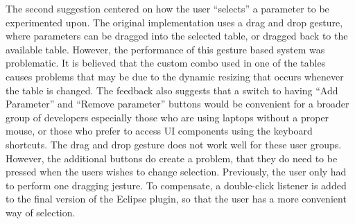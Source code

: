 The second suggestion centered on how the user ``selects'' a parameter to be experimented upon. The original implementation uses a drag and drop gesture, where parameters can be dragged into the selected table, or dragged back to the available table. However, the performance of this gesture based system was problematic. It is believed that the custom combo used in one of the tables causes problems that may be due to the dynamic resizing that occurs whenever the table is changed. The feedback also suggests that a switch to having ``Add Parameter'' and ``Remove parameter'' buttons would be convenient for a broader group of developers especially those who are using laptops without a proper mouse, or those who prefer to access UI components using the keyboard shortcuts. The drag and drop gesture does not work well for these user groups.\\
However, the additional buttons do create a problem, that they do need to be pressed when the users wishes to change selection. Previously, the user only had to perform one dragging jesture. To compensate, a double-click listener is added to the final version of the Eclipse plugin, so that the user has a more convenient way of selection.

\newpage
